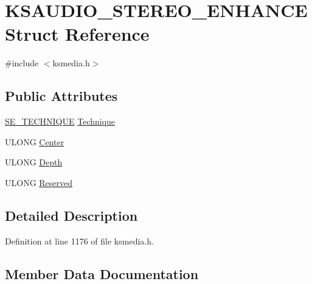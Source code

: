 \hypertarget{struct_k_s_a_u_d_i_o___s_t_e_r_e_o___e_n_h_a_n_c_e}{}\section{K\+S\+A\+U\+D\+I\+O\+\_\+\+S\+T\+E\+R\+E\+O\+\_\+\+E\+N\+H\+A\+N\+CE Struct Reference}
\label{struct_k_s_a_u_d_i_o___s_t_e_r_e_o___e_n_h_a_n_c_e}


{\ttfamily \#include $<$ksmedia.\+h$>$}

\subsection*{Public Attributes}
\begin{DoxyCompactItemize}
\item 
\hyperlink{ksmedia_8h_aa6feda4fb9d8ed343cfafb58bfe60eb8}{S\+E\+\_\+\+T\+E\+C\+H\+N\+I\+Q\+UE} \hyperlink{struct_k_s_a_u_d_i_o___s_t_e_r_e_o___e_n_h_a_n_c_e_a3dfa5ed56e3347419b9fcf3242159c15}{Technique}
\item 
U\+L\+O\+NG \hyperlink{struct_k_s_a_u_d_i_o___s_t_e_r_e_o___e_n_h_a_n_c_e_af14ee918ba1c68eb85f09bc6a442194f}{Center}
\item 
U\+L\+O\+NG \hyperlink{struct_k_s_a_u_d_i_o___s_t_e_r_e_o___e_n_h_a_n_c_e_a6acafd78212c2965d13ae784787c769f}{Depth}
\item 
U\+L\+O\+NG \hyperlink{struct_k_s_a_u_d_i_o___s_t_e_r_e_o___e_n_h_a_n_c_e_a33d9fc3027b6ce82b729168e189d12f8}{Reserved}
\end{DoxyCompactItemize}


\subsection{Detailed Description}


Definition at line 1176 of file ksmedia.\+h.



\subsection{Member Data Documentation}
